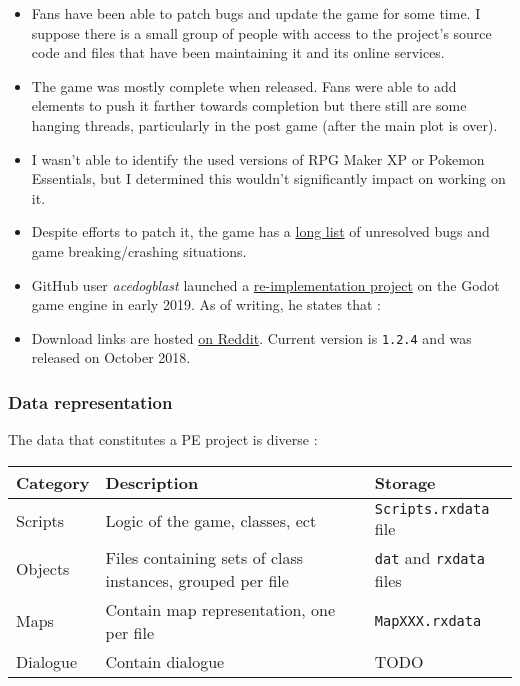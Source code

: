 \documentclass[11pt]{article}
\begin{document}
\begin{itemize}
	\item Fans have been able to patch bugs and update the game for some time. I suppose there is a small group of people with access to the project's source code and files that have been maintaining it and its online services.
	
	\item The game was mostly complete when released. Fans were able to add elements to push it farther towards completion but there still are some hanging threads, particularly in the post game (after the main plot is over).
	
	\item I wasn't able to identify the used versions of RPG Maker XP or Pokemon Essentials, but I determined this wouldn't significantly impact on working on it.
	
	\item Despite efforts to patch it, the game has a \href{https://pokemon-uranium.fandom.com/wiki/Bugs_and_Errors}{long list} of unresolved bugs and game breaking/crashing situations.
	
	\item GitHub user \textit{acedogblast} launched a \href{https://github.com/acedogblast/Project-Uranium-Godot}{re-implementation project} on the Godot game engine in early 2019. As of writing, he states that :
	
	\item Download links are hosted \href{https://www.reddit.com/r/pokemonuranium/comments/a0cw0i/download_links/}{on Reddit}. Current version is \verb|1.2.4| and was released on October  2018.
\end{itemize}


\subsubsection{Data representation}

The data that constitutes a PE project is diverse :

\begin{tabular}{|L{.1\textwidth}|L{.52\textwidth}|L{.3\textwidth}|}
	\hline
	\textbf{Category} & \textbf{Description} & \textbf{Storage} \\
	\hline
	Scripts & Logic of the game, classes, ect & \verb|Scripts.rxdata| file \\
	\hline
	Objects & Files containing sets of class instances, grouped per file & \verb|dat| and \verb|rxdata| files \\
	\hline
	Maps & Contain map representation, one per file & \verb|MapXXX.rxdata| \\
	\hline
	Dialogue & Contain dialogue & TODO \\
	\hline
\end{tabular}
\end{document}
